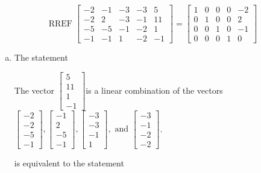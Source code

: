 \begin{exerciseAnswer} 
\[\operatorname{RREF}  \left[\begin{array}{cccc|c}
-2 & -1 & -3 & -3 & 5 \\
-2 & 2 & -3 & -1 & 11 \\
-5 & -5 & -1 & -2 & 1 \\
-1 & -1 & 1 & -2 & -1
\end{array}\right] = \left[\begin{array}{cccc|c}
1 & 0 & 0 & 0 & -2 \\
0 & 1 & 0 & 0 & 2 \\
0 & 0 & 1 & 0 & -1 \\
0 & 0 & 0 & 1 & 0
\end{array}\right] \]
\begin{enumerate}[(a)]
\item  The statement 
\begin{center}\begin{minipage}{0.8\textwidth}
 The vector \( \left[\begin{array}{c}
5 \\
11 \\
1 \\
-1
\end{array}\right] \)is a linear combination of the vectors \( \left[\begin{array}{c}
-2 \\
-2 \\
-5 \\
-1
\end{array}\right] , \left[\begin{array}{c}
-1 \\
2 \\
-5 \\
-1
\end{array}\right] , \left[\begin{array}{c}
-3 \\
-3 \\
-1 \\
1
\end{array}\right] , \text{ and } \left[\begin{array}{c}
-3 \\
-1 \\
-2 \\
-2
\end{array}\right] \). 
\end{minipage}\end{center}
     is equivalent to the statement 
\begin{center}\begin{minipage}{0.8\textwidth}

\end{minipage}
\end{center}
\end{enumerate}
\end{exerciseAnswer}
